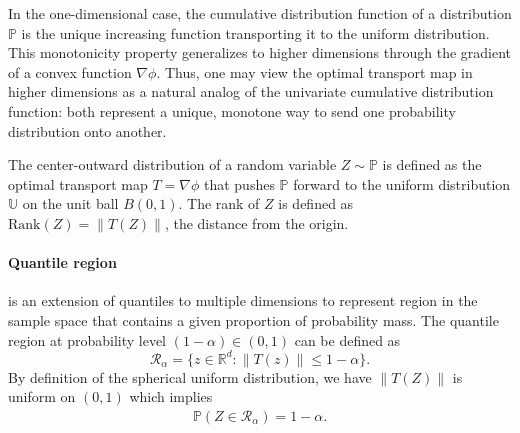 In the one-dimensional case, the cumulative distribution function of a distribution $\mathbb{P}$ is the unique increasing function transporting it to the uniform distribution. This monotonicity property generalizes to higher dimensions through the gradient of a convex function $\nabla \phi$. Thus, one may view the optimal transport map in higher dimensions as a natural analog of the univariate cumulative distribution function: both represent a unique, monotone way to send one probability distribution onto another.

\begin{definition}
    The center-outward distribution of a random variable $Z \sim \mathbb{P}$ is defined as the optimal transport map $T = \nabla \phi$ that pushes $\mathbb{P}$ forward to the uniform distribution $\mathbb{U}$ on the unit ball $B(0,1)$.
    The rank of $Z$ is defined as $\mathrm{Rank}(Z) = \|T(Z)\|$, the distance from the origin.
\end{definition}

\paragraph{Quantile region} is an extension of quantiles to multiple dimensions to represent region in the sample space that contains a given proportion of probability mass. The quantile region at probability level $(1-\alpha) \in (0,1)$ can be defined as
$$
\mathcal{R}_{\alpha} = \{z \in \mathbb{R}^d : \|T(z)\| \leq  1-\alpha\}.
$$
By definition of the spherical uniform distribution, we have $\|T(Z)\|$ is uniform on $(0,1)$ which implies
\begin{align}\label{eq:exact_continuous_coverage}
\mathbb{P}(Z \in \mathcal{R}_{\alpha}) = 1-\alpha.
\end{align}

